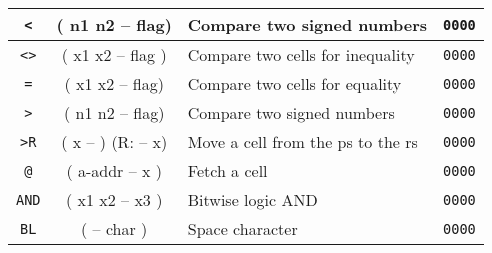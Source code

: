 \begin{center}
\begin{longtable}{|c|c|l|c|}
      \texttt{<}                              &
      ( n1 n2 -- flag)                        &
      Compare two signed numbers              &
      \texttt{0000}                           \\ \hline
                              
      \texttt{<>}                             &
      ( x1 x2 -- flag )                       &
      Compare two cells for inequality        &
      \texttt{0000}                           \\ \hline
                              
      \texttt{=}                              &
      ( x1 x2 -- flag)                        &
      Compare two cells for equality          &
      \texttt{0000}                           \\ \hline

      \texttt{>}                              &
      ( n1 n2 -- flag)                        &
      Compare two signed numbers              &
      \texttt{0000}                           \\ \hline
                              
      \texttt{>R}                             &
      ( x -- ) (R: -- x)                      &
      Move a cell from the \gls{ps} to the \gls{rs} &
      \texttt{0000}                           \\ \hline
                                                         
      \texttt{@}                              &
      ( a-addr -- x )                         &
      Fetch a cell                            &
      \texttt{0000}                           \\ \hline
                                              
      \texttt{AND}                            &
      ( x1 x2 -- x3 )                         &
      Bitwise logic AND                       &
      \texttt{0000}                           \\ \hline
                                              
      \texttt{BL}                             &
      ( -- char )                             &
      Space character                         &
      \texttt{0000}                           \\ \hline
                                              

\end{longtable}
\end{center}
